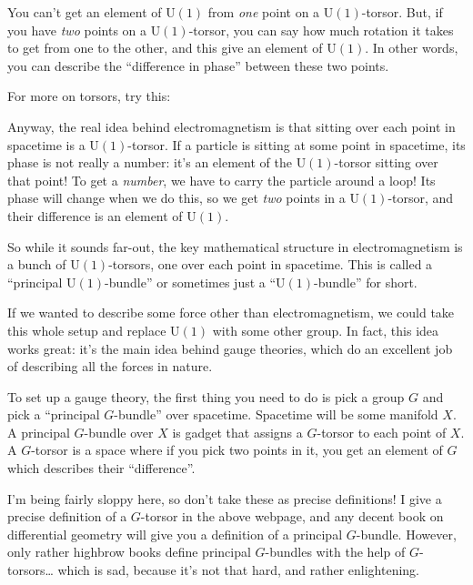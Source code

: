 \documentclass{article}
\def\tightlist{}
\renewcommand{\texttt}[1]{%
  \begingroup
  \ttfamily
  \begingroup\lccode`~=`/\lowercase{\endgroup\def~}{/\discretionary{}{}{}}%
  \begingroup\lccode`~=`[\lowercase{\endgroup\def~}{[\discretionary{}{}{}}%
  \begingroup\lccode`~=`.\lowercase{\endgroup\def~}{.\discretionary{}{}{}}%
  \catcode`/=\active\catcode`[=\active\catcode`.=\active
  \scantokens{#1\noexpand}%
  \endgroup
}
\begin{document}
You can't get an element of \(\mathrm{U}(1)\) from \emph{one} point on a
\(\mathrm{U}(1)\)-torsor. But, if you have \emph{two} points on a
\(\mathrm{U}(1)\)-torsor, you can say how much rotation it takes to get
from one to the other, and this give an element of \(\mathrm{U}(1)\). In
other words, you can describe the ``difference in phase'' between these
two points.

For more on torsors, try this:


Anyway, the real idea behind electromagnetism is that sitting over each
point in spacetime is a \(\mathrm{U}(1)\)-torsor. If a particle is
sitting at some point in spacetime, its phase is not really a number:
it's an element of the \(\mathrm{U}(1)\)-torsor sitting over that point!
To get a \emph{number}, we have to carry the particle around a loop! Its
phase will change when we do this, so we get \emph{two} points in a
\(\mathrm{U}(1)\)-torsor, and their difference is an element of
\(\mathrm{U}(1)\).

So while it sounds far-out, the key mathematical structure in
electromagnetism is a bunch of \(\mathrm{U}(1)\)-torsors, one over each
point in spacetime. This is called a ``principal
\(\mathrm{U}(1)\)-bundle'' or sometimes just a
``\(\mathrm{U}(1)\)-bundle'' for short.

If we wanted to describe some force other than electromagnetism, we
could take this whole setup and replace \(\mathrm{U}(1)\) with some
other group. In fact, this idea works great: it's the main idea behind
gauge theories, which do an excellent job of describing all the forces
in nature.

To set up a gauge theory, the first thing you need to do is pick a group
\(G\) and pick a ``principal \(G\)-bundle'' over spacetime. Spacetime
will be some manifold \(X\). A principal \(G\)-bundle over \(X\) is
gadget that assigns a \(G\)-torsor to each point of \(X\). A
\(G\)-torsor is a space where if you pick two points in it, you get an
element of \(G\) which describes their ``difference''.

I'm being fairly sloppy here, so don't take these as precise
definitions! I give a precise definition of a \(G\)-torsor in the above
webpage, and any decent book on differential geometry will give you a
definition of a principal \(G\)-bundle. However, only rather highbrow
books define principal \(G\)-bundles with the help of
\(G\)-torsors\ldots{} which is sad, because it's not that hard, and
rather enlightening.
\end{document}

